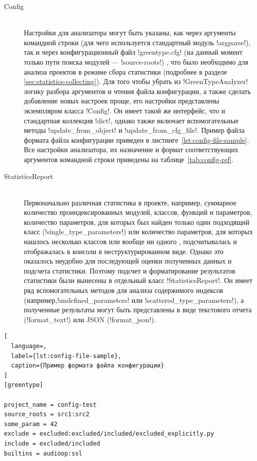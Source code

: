\begin{description}
  \item[Config] \hfill \\
    Настройки для анализатора могут быть указаны, как через аргументы командной
    строки (для чего используется стандартный модуль !argparse!), так и через
    конфигурационный файл !greentype.cfg! (на данный момент только пути поиска
    модулей --- !source-roots!) , что было необходимо для анализа
    проектов в режиме сбора статистики (подробнее в разделе
    \ref{sec:statistics-collecting}). Для того чтобы убрать из
    !GreenTypeAnalyzer! логику разбора аргументов и чтения файла конфигурации, а
    также сделать добавление новых настроек проще, его настройки представлены
    экземпляром класса !Config!. Он имеет такой же интерфейс, что и стандартная
    коллекция !dict!, однако также включает вспомогательные методы
    !update_from_object! и !update_from_cfg_file!. Пример файла формата файла
    конфигурации приведен в листинге~\ref{lst:config-file-sample}. Все настройки
    анализатора, их назначение и формат соответствующих аргументов командной
    строки приведены на таблице~\ref{tab:config-ref}.

  \item[StatisticsReport] \hfill \\
    Первоначально различная статистика в проекте, например, суммарное количество
    проиндексированных модулей, классов, функций и параметров, количество
    параметров, для которых был найден только один подходящий класс
    (!single_type_parameters!) или количество параметров, для которых нашлось
    несколько классов или вообще ни одного , подсчитывалась и отображалась в
    консоли в неструктурированном виде. Однако это оказалось неудобно для
    последующей оценки полученных данных и подсчета статистики. Поэтому подсчет
    и форматирование результатов статистики были вынесены в отдельный класс
    !StatisticsReport!. Он имеет ряд вспомогательных методов для анализа
    содержимого индексов (например,!undefined_parameters!  или
    !scattered_type_parameters!), а полученные результаты могут быть
    представлены в виде текстового отчета (!format_text!) или JSON
    (!format_json!). 

  
\end{description}

\begin{lstlisting}[
  language=,
  label={lst:config-file-sample},
  caption={Пример формата файла конфигурации}
]
[greentype]

project_name = config-test
source_roots = src1:src2
some_param = 42
exclude = excluded:excluded/included/excluded_explicitly.py
include = excluded/included
builtins = audioop:ssl
\end{lstlisting}

